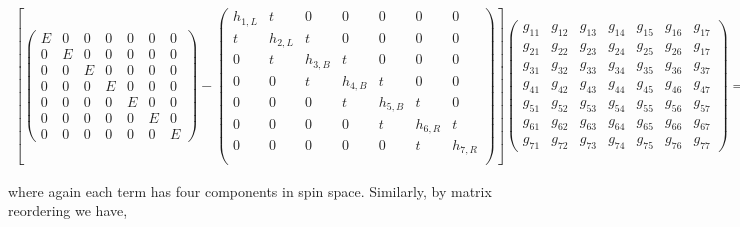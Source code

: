 \documentclass[10pt,prb,showpacs,amssymb,floatfix]{revtex4-1}
\begin{document}
\begin{align}
 \left[ \left(\begin{array}{ccccccc} 
E    &  0 & 0 &  0 & 0 &  0 & 0 \\
0    &  E & 0 &  0 & 0 &  0 & 0 \\
0    & 0  & E &  0 & 0 &  0 & 0 \\
0    & 0  & 0 &  E & 0 &  0 & 0 \\
0    & 0  & 0 &  0 & E &  0 & 0 \\
0    & 0  & 0 &  0 & 0 &  E & 0 \\
0    & 0  & 0 &  0 & 0 &  0 & E 
\end{array}\right) -
 \left(\begin{array}{ccccccc} 
h_{1,L}   &  t & 0 & 0 & 0 & 0 & 0 \\
t &  h_{2,L} & t  & 0 & 0 & 0 & 0\\
 0 & t & h_{3,B} & t & 0 & 0 & 0 \\
  0 & 0 & t & h_{4,B} & t & 0 & 0 \\
  0 & 0 & 0 & t & h_{5,B} & t & 0 \\
  0 & 0 & 0 & 0 & t & h_{6,R} & t \\
  0 & 0 & 0 &0 & 0 & t & h_{7,R} \\
\end{array}\right) \right] 
 \left(\begin{array}{ccccccc} 
g_{11}   &  g_{12} & g_{13} & g_{14}   &  g_{15} & g_{16} & g_{17}  \\
g_{21}   &  g_{22} & g_{23} & g_{24}   &  g_{25} & g_{26} & g_{17}  \\
g_{31}   &  g_{32} & g_{33} & g_{34}   &  g_{35} & g_{36} & g_{37}  \\
g_{41}   &  g_{42} & g_{43} & g_{44}   &  g_{45} & g_{46} & g_{47}  \\
g_{51}   &  g_{52} & g_{53} & g_{54}   &  g_{55} & g_{56} & g_{57}  \\
g_{61}   &  g_{62} & g_{63} & g_{64}   &  g_{65} & g_{66} & g_{67}  \\
g_{71}   &  g_{72} & g_{73} & g_{74}   &  g_{75} & g_{76} & g_{77}  
\end{array}\right) =  
I,
\label{mat004}
\end{align}

where again each term has four components in spin space. Similarly, by matrix reordering we have,
\end{document}
